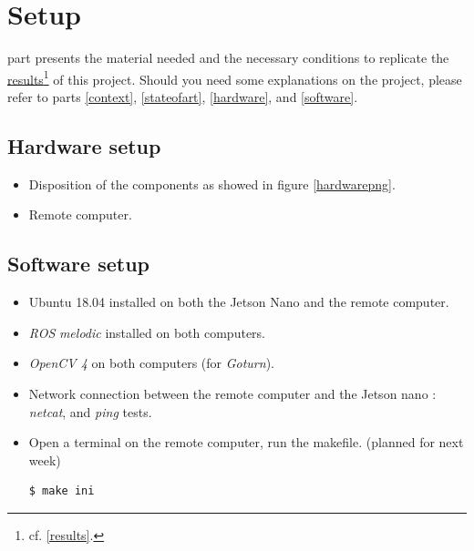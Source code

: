 		\FloatBarrier
		
\chapter{Setup}\label{setup}

	 part presents the material needed and the 
	necessary conditions to replicate the \hyperref[results]{results}\footnote{cf. \vref{results}.} of
	this project. Should you need some explanations on the project, please
	refer to parts \vref{context}, \vref{stateofart}, \vref{hardware}, and \vref{software}.

	\section{Hardware setup}

	
	\begin{itemize}
		\item [\ding{55}] Disposition of the components as showed in figure \vref{hardwarepng}.
		\item [\ding{55}] Remote computer.
	\end{itemize}
	
	
	\section{Software setup}
	
	\begin{itemize}
		\item [\ding{55}] Ubuntu 18.04 installed on both the Jetson Nano and the remote computer. 
		\item [\ding{55}] \textit{ROS} \textit{melodic} installed on both computers.
		\item [\ding{55}] \textit{OpenCV 4} on both computers (for \textit{Goturn}).
		\item [\ding{55}] Network connection between the remote computer and the Jetson nano : \textit{netcat}, and \textit{ping} tests.
		\item [\ding{55}] Open a terminal on the remote computer, run the makefile. (planned for next week)
		\begin{lstlisting}[style=BashInputStyle]
		$ make ini
		\end{lstlisting}
	\end{itemize}